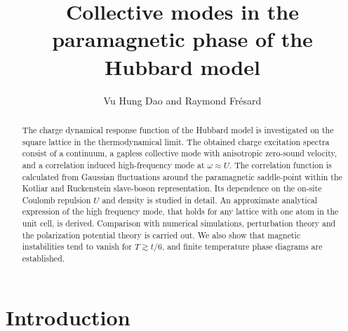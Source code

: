 \documentclass[showpacs,amsmath,twocolumn,floatfix]{revtex4-1}
\begin{document}
\title{Collective modes in the paramagnetic phase of the Hubbard model}
\author{Vu Hung Dao and Raymond Fr\'esard}

\begin{abstract}
The charge dynamical response function of the Hubbard model is investigated
on the square lattice in the thermodynamical limit. The obtained charge
excitation spectra consist of a continuum, a gapless collective mode with
anisotropic zero-sound velocity, and a correlation induced high-frequency mode
at $\omega\approx U$. The correlation function is calculated from Gaussian
fluctuations around the paramagnetic saddle-point within the Kotliar and
Ruckenstein slave-boson representation. Its dependence on the on-site Coulomb
repulsion $U$ and density is studied in detail. An approximate analytical
expression of the high frequency mode, that holds for any lattice
with one atom in the unit cell, is derived. Comparison with numerical 
simulations, perturbation theory and the polarization potential theory is
carried out. We also show that magnetic instabilities tend to vanish for
$T\gtrsim t/6$, and finite temperature phase diagrams are established.
\end{abstract}

\maketitle
\section{Introduction}
\label{sec:int}
\end{document}
